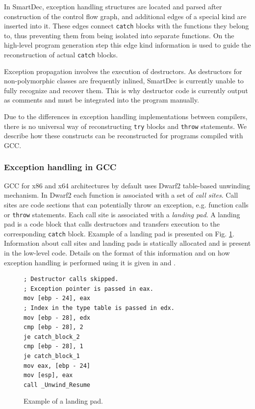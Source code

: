 \documentclass[10pt, conference, compsocconf]{IEEEtran}
\begin{document}
In SmartDec, exception handling structures are located and parsed after 
construction of the control flow graph, and additional edges of a special kind are 
inserted into it. 
These edges connect \lstinline{catch} blocks with the functions they belong to, 
thus preventing them from being isolated into separate functions.
On the high-level program generation step this edge kind information is used to guide 
the reconstruction of actual \lstinline{catch} blocks.

Exception propagation involves the execution of destructors. As destructors for
non-polymorphic classes are frequently inlined, SmartDec is currently
unable to fully recognize and recover them. This is why destructor code
is currently output as comments and must be integrated into the program 
manually.

Due to the differences in exception handling implementations between compilers,
there is no universal way of reconstructing \lstinline{try} blocks and 
\lstinline{throw} statements. We describe how these constructs can be 
reconstructed for programs compiled with GCC.



\subsubsection{Exception handling in GCC}
GCC for x86 and x64 architectures by default uses Dwarf2 table-based unwinding mechanism.
In Dwarf2 each function is associated with a set of \textit{call sites}. 
Call sites are code sections that can potentially throw an exception, 
e.g. function calls or \lstinline{throw} statements. 
Each call site is associated with a \textit{landing pad}.
A landing pad is a code block that calls destructors and transfers 
execution to the corresponding \lstinline{catch} block. 
Example of a landing pad is presented on Fig. \ref{fig:lpad}.
Information about call sites and landing pads is statically allocated and is present in the low-level code. 
Details on the format of this information and on how exception
handling is performed using it is given in \cite{gccabi} and \cite{linuxspec}.

\begin{figure}[tb!]
\centering
{
\lstset{basicstyle=\scriptsize, language=[x86masm]Assembler}
\begin{lstlisting}
; Destructor calls skipped.
; Exception pointer is passed in eax.
mov [ebp - 24], eax
; Index in the type table is passed in edx.
mov [ebp - 28], edx
cmp [ebp - 28], 2
je catch_block_2
cmp [ebp - 28], 1
je catch_block_1
mov eax, [ebp - 24]
mov [esp], eax
call _Unwind_Resume
\end{lstlisting}
}
\caption{Example of a landing pad.}
\label{fig:lpad}
\end{figure}
\end{document}
